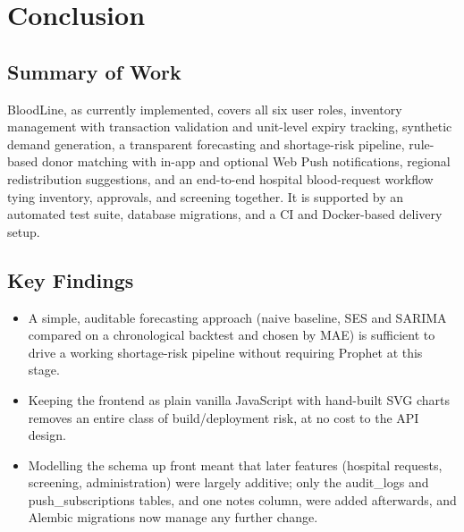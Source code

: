 \documentclass[12pt,a4paper,twoside]{report}
\begin{document}
\chapter{Conclusion}
\section{Summary of Work}
BloodLine, as currently implemented, covers all six user roles, inventory management with transaction validation and unit-level expiry tracking, synthetic demand generation, a transparent forecasting and shortage-risk pipeline, rule-based donor matching with in-app and optional Web Push notifications, regional redistribution suggestions, and an end-to-end hospital blood-request workflow tying inventory, approvals, and screening together. It is supported by an automated test suite, database migrations, and a CI and Docker-based delivery setup.

\section{Key Findings}
\begin{itemize}
\item A simple, auditable forecasting approach (naive baseline, SES and SARIMA compared on a chronological backtest and chosen by MAE) is sufficient to drive a working shortage-risk pipeline without requiring Prophet at this stage.
\item Keeping the frontend as plain vanilla JavaScript with hand-built SVG charts removes an entire class of build/deployment risk, at no cost to the API design.
\item Modelling the schema up front meant that later features (hospital requests, screening, administration) were largely additive; only the audit\_logs and push\_subscriptions tables, and one notes column, were added afterwards, and Alembic migrations now manage any further change.
\end{itemize}
\end{document}
